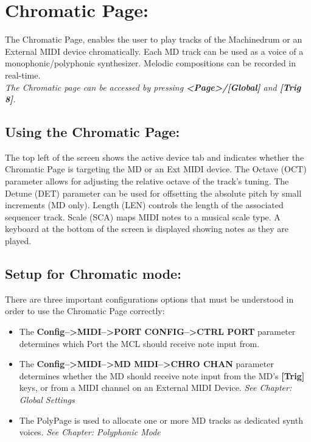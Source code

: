 \chapter{Chromatic Page:}
The Chromatic Page, enables the user to play tracks of the Machinedrum or an External MIDI device chromatically. Each MD track can be used as a voice of a monophonic/polyphonic synthesizer. Melodic compositions can be recorded in real-time.
\\
\textit{The Chromatic page can be accessed by pressing \textbf{<Page>/[Global]} and \textbf{[Trig 8]}.}
\\
\section{Using the Chromatic Page:}
The top left of the screen shows the active device tab and indicates whether the Chromatic Page is targeting the MD or an Ext MIDI device.
The Octave (OCT) parameter allows for adjusting the relative octave of the track's tuning. The Detune (DET) parameter can be used for offsetting the absolute pitch by small increments (MD only). Length (LEN) controls the length of the associated sequencer track. Scale (SCA) maps MIDI notes to a musical scale type.
A keyboard at the bottom of the screen is displayed showing notes as they are played.
\newpage
\section{Setup for Chromatic mode:}
There are three important configurations options that must be understood in order to use the Chromatic Page correctly:
\begin{itemize}
    \item The \textbf{Config-->MIDI-->PORT CONFIG-->CTRL PORT} parameter determines which Port the MCL should receive note input from. 
    \item The \textbf{Config-->MIDI-->MD MIDI-->CHRO CHAN} parameter determines whether the MD should receive note input from the MD's \textbf{[Trig]} keys, or from a MIDI channel on an External MIDI Device. \textit{See Chapter: Global Settings}
    \item The PolyPage is used to allocate one or more MD tracks as dedicated synth voices. \textit{See Chapter: Polyphonic Mode} 
\end{itemize}

